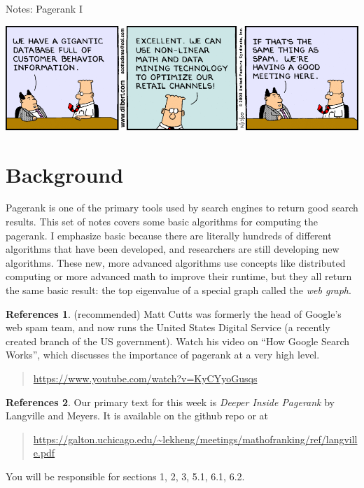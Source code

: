 \documentclass[10pt]{article}
\theoremstyle{definition}
\newtheorem{refr}{References}
\begin{document}
\begin{center}
{
\Huge
Notes: Pagerank I
}

\end{center}

\begin{center}
\includegraphics[width=\textwidth]{dilbert}
\end{center}

\section{Background}

Pagerank is one of the primary tools used by search engines to return good search results.
This set of notes covers some basic algorithms for computing the pagerank.
I emphasize basic because there are literally hundreds of different algorithms that have been developed,
and researchers are still developing new algorithms.
These new, more advanced algorithms use concepts like distributed computing or more advanced math to improve their runtime,
but they all return the same basic result:
the top eigenvalue of a special graph called the \emph{web graph}.

\begin{refr}
    (recommended)
    Matt Cutts was formerly the head of Google's web spam team,
    and now runs the United States Digital Service (a recently created branch of the US government).
    Watch his video on ``How Google Search Works'', which discusses the importance of pagerank at a very high level.
    \begin{quote}
    \url{https://www.youtube.com/watch?v=KyCYyoGusqs}
    \end{quote}
\end{refr}

\begin{refr}
    Our primary text for this week is \emph{Deeper Inside Pagerank} by Langville and Meyers.
    It is available on the github repo or at
    \begin{quote}
    \url{https://galton.uchicago.edu/~lekheng/meetings/mathofranking/ref/langville.pdf}
    \end{quote}
    You will be responsible for sections 1, 2, 3, 5.1, 6.1, 6.2.
\end{refr}
\end{document}
